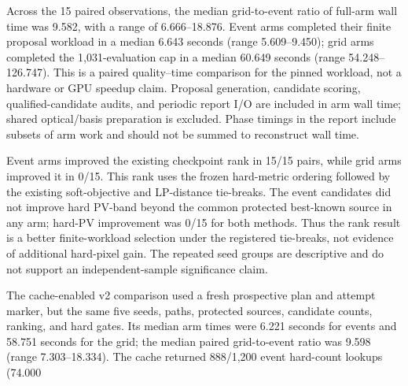 \documentclass[conference]{IEEEtran}
\begin{document}
Across the 15 paired observations, the median grid-to-event ratio of full-arm wall time was 9.582, with a range of 6.666--18.876. Event arms completed their finite proposal workload in a median 6.643 seconds (range 5.609--9.450); grid arms completed the 1,031-evaluation cap in a median 60.649 seconds (range 54.248--126.747). This is a paired quality--time comparison for the pinned workload, not a hardware or GPU speedup claim. Proposal generation, candidate scoring, qualified-candidate audits, and periodic report I/O are included in arm wall time; shared optical/basis preparation is excluded. Phase timings in the report include subsets of arm work and should not be summed to reconstruct wall time.

Event arms improved the existing checkpoint rank in 15/15 pairs, while grid arms improved it in 0/15. This rank uses the frozen hard-metric ordering followed by the existing soft-objective and LP-distance tie-breaks. The event candidates did not improve hard PV-band beyond the common protected best-known source in any arm; hard-PV improvement was 0/15 for both methods. Thus the rank result is a better finite-workload selection under the registered tie-breaks, not evidence of additional hard-pixel gain. The repeated seed groups are descriptive and do not support an independent-sample significance claim.

The cache-enabled v2 comparison used a fresh prospective plan and attempt marker, but the same five seeds, paths, protected sources, candidate counts, ranking, and hard gates. Its median arm times were 6.221 seconds for events and 58.751 seconds for the grid; the median paired grid-to-event ratio was 9.598 (range 7.303--18.334). The cache returned 888/1,200 event hard-count lookups (74.000%
\end{document}
